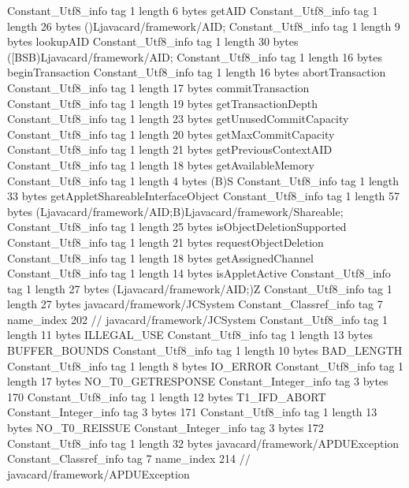 {{{		}
		Constant_Utf8_info {
			tag	1
			length	6
			bytes	getAID
		}
		Constant_Utf8_info {
			tag	1
			length	26
			bytes	()Ljavacard/framework/AID;
		}
		Constant_Utf8_info {
			tag	1
			length	9
			bytes	lookupAID
		}
		Constant_Utf8_info {
			tag	1
			length	30
			bytes	([BSB)Ljavacard/framework/AID;
		}
		Constant_Utf8_info {
			tag	1
			length	16
			bytes	beginTransaction
		}
		Constant_Utf8_info {
			tag	1
			length	16
			bytes	abortTransaction
		}
		Constant_Utf8_info {
			tag	1
			length	17
			bytes	commitTransaction
		}
		Constant_Utf8_info {
			tag	1
			length	19
			bytes	getTransactionDepth
		}
		Constant_Utf8_info {
			tag	1
			length	23
			bytes	getUnusedCommitCapacity
		}
		Constant_Utf8_info {
			tag	1
			length	20
			bytes	getMaxCommitCapacity
		}
		Constant_Utf8_info {
			tag	1
			length	21
			bytes	getPreviousContextAID
		}
		Constant_Utf8_info {
			tag	1
			length	18
			bytes	getAvailableMemory
		}
		Constant_Utf8_info {
			tag	1
			length	4
			bytes	(B)S
		}
		Constant_Utf8_info {
			tag	1
			length	33
			bytes	getAppletShareableInterfaceObject
		}
		Constant_Utf8_info {
			tag	1
			length	57
			bytes	(Ljavacard/framework/AID;B)Ljavacard/framework/Shareable;
		}
		Constant_Utf8_info {
			tag	1
			length	25
			bytes	isObjectDeletionSupported
		}
		Constant_Utf8_info {
			tag	1
			length	21
			bytes	requestObjectDeletion
		}
		Constant_Utf8_info {
			tag	1
			length	18
			bytes	getAssignedChannel
		}
		Constant_Utf8_info {
			tag	1
			length	14
			bytes	isAppletActive
		}
		Constant_Utf8_info {
			tag	1
			length	27
			bytes	(Ljavacard/framework/AID;)Z
		}
		Constant_Utf8_info {
			tag	1
			length	27
			bytes	javacard/framework/JCSystem
		}
		Constant_Classref_info {
			tag	7
			name_index	202		// javacard/framework/JCSystem
		}
		Constant_Utf8_info {
			tag	1
			length	11
			bytes	ILLEGAL_USE
		}
		Constant_Utf8_info {
			tag	1
			length	13
			bytes	BUFFER_BOUNDS
		}
		Constant_Utf8_info {
			tag	1
			length	10
			bytes	BAD_LENGTH
		}
		Constant_Utf8_info {
			tag	1
			length	8
			bytes	IO_ERROR
		}
		Constant_Utf8_info {
			tag	1
			length	17
			bytes	NO_T0_GETRESPONSE
		}
		Constant_Integer_info {
			tag	3
			bytes	170
		}
		Constant_Utf8_info {
			tag	1
			length	12
			bytes	T1_IFD_ABORT
		}
		Constant_Integer_info {
			tag	3
			bytes	171
		}
		Constant_Utf8_info {
			tag	1
			length	13
			bytes	NO_T0_REISSUE
		}
		Constant_Integer_info {
			tag	3
			bytes	172
		}
		Constant_Utf8_info {
			tag	1
			length	32
			bytes	javacard/framework/APDUException
		}
		Constant_Classref_info {
			tag	7
			name_index	214		// javacard/framework/APDUException
}}}
